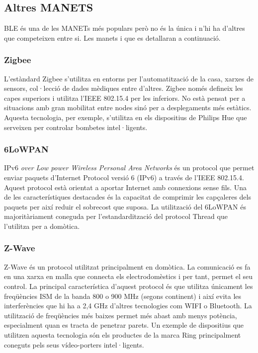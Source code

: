 \subsection{Altres MANETS}
\label{MANETS}
BLE és una de les MANETs més populars però no és la única i n'hi ha d'altres que competeixen entre si.
Les manets 
 i que es detallaran a continuació.

\subsubsection{Zigbee}
L'estàndard Zigbee s'utilitza en entorns per l'automatització de la casa, xarxes de sensors, col·lecció de dades mèdiques entre d'altres.
Zigbee només defineix les capes superiors i utilitza l'IEEE 802.15.4\footnotemark{} per les inferiors.
No està pensat per a situacions amb gran mobilitat entre nodes sinó per a desplegaments més estàtics.
Aquesta tecnologia, per exemple, s'utilitza en els dispositius de Philips Hue que serveixen per controlar bombetes intel·ligents.

\subsubsection{6LoWPAN}
IPv6 \textit{over Low power Wireless Personal Area Networks} és un protocol que permet enviar paquets d'Internet Protocol versió 6 (IPv6) a través de l'IEEE 802.15.4\footnotemark[\value{footnote}].
Aquest protocol està orientat a aportar Internet amb connexions sense fils.
Una de les característiques destacades és la capacitat de comprimir les capçaleres dels paquets per així reduir el sobrecost que suposa.
La utilització del 6LoWPAN és majoritàriament coneguda per l'estandardització del protocol Thread que l'utilitza per a domòtica.


\subsubsection{Z-Wave}
Z-Wave és un protocol utilitzat principalment en domòtica. La comunicació es fa en una xarxa en malla que connecta els electrodomèstics i per tant, permet el seu control.
La principal característica d'aquest protocol és que utilitza únicament les freqüències ISM de la banda 800 o 900 MHz (segons continent) i així evita les interferències que hi ha a 2,4 GHz d'altres tecnologies com WIFI o Bluetooth.
La utilització de freqüències més baixes permet més abast amb menys potència, especialment quan es tracta de penetrar parets.
Un exemple de dispositius que utilitzen aquesta tecnologia són els productes de la marca Ring principalment coneguts pels seus vídeo-porters intel·ligents.

